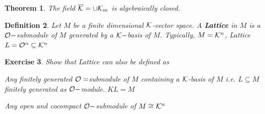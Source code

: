 \documentclass[11pt]{article}
\newtheorem{thm}{Theorem}[section]
\newtheorem{exercise}[thm]{Exercise}
\newtheorem{dfn}[thm]{Definition}
\newcommand{\calk}{{\cal K}}
\newcommand{\calo}{{\cal O}}
\begin{document}
\begin{thm}\label{thm:K_algebraically_closed}
The field $\overline{\calk}=\cup\calk_m$ is algebraically closed.
\end{thm}

\begin{dfn}
Let $M$ be a finite dimensional $\calk$-vector space. A \textbf{Lattice} in $M$ is a $\calo-$submodule of $M$ generated by a $\calk-$basis of $M$. Typically, $M=\calk^n$, Lattice $L=\calo^n\subseteq \calk^n$
\end{dfn}

\begin{exercise}
Show that Lattice can also be defined as

Any finitely generated $\calo=$submodule of $M$ containing a $\calk$-basis of $M$ i.e. $L\subseteq M$ finitely generated as $\calo-$module. $KL=M$

Any open and cocompact $\calo-$submodule of $M\cong \calk^n$
\end{exercise}
\end{document}
